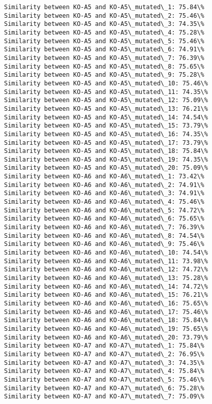 \documentclass[11pt]{article}
\begin{document}
\begin{Verbatim}[commandchars=\\\{\}]
Similarity between KO-A5 and KO-A5\_mutated\_1: 75.84\%
Similarity between KO-A5 and KO-A5\_mutated\_2: 75.46\%
Similarity between KO-A5 and KO-A5\_mutated\_3: 74.35\%
Similarity between KO-A5 and KO-A5\_mutated\_4: 75.28\%
Similarity between KO-A5 and KO-A5\_mutated\_5: 75.46\%
Similarity between KO-A5 and KO-A5\_mutated\_6: 74.91\%
Similarity between KO-A5 and KO-A5\_mutated\_7: 76.39\%
Similarity between KO-A5 and KO-A5\_mutated\_8: 75.65\%
Similarity between KO-A5 and KO-A5\_mutated\_9: 75.28\%
Similarity between KO-A5 and KO-A5\_mutated\_10: 75.46\%
Similarity between KO-A5 and KO-A5\_mutated\_11: 74.35\%
Similarity between KO-A5 and KO-A5\_mutated\_12: 75.09\%
Similarity between KO-A5 and KO-A5\_mutated\_13: 76.21\%
Similarity between KO-A5 and KO-A5\_mutated\_14: 74.54\%
Similarity between KO-A5 and KO-A5\_mutated\_15: 73.79\%
Similarity between KO-A5 and KO-A5\_mutated\_16: 74.35\%
Similarity between KO-A5 and KO-A5\_mutated\_17: 73.79\%
Similarity between KO-A5 and KO-A5\_mutated\_18: 75.84\%
Similarity between KO-A5 and KO-A5\_mutated\_19: 74.35\%
Similarity between KO-A5 and KO-A5\_mutated\_20: 75.09\%
Similarity between KO-A6 and KO-A6\_mutated\_1: 73.42\%
Similarity between KO-A6 and KO-A6\_mutated\_2: 74.91\%
Similarity between KO-A6 and KO-A6\_mutated\_3: 74.91\%
Similarity between KO-A6 and KO-A6\_mutated\_4: 75.46\%
Similarity between KO-A6 and KO-A6\_mutated\_5: 74.72\%
Similarity between KO-A6 and KO-A6\_mutated\_6: 75.65\%
Similarity between KO-A6 and KO-A6\_mutated\_7: 76.39\%
Similarity between KO-A6 and KO-A6\_mutated\_8: 74.54\%
Similarity between KO-A6 and KO-A6\_mutated\_9: 75.46\%
Similarity between KO-A6 and KO-A6\_mutated\_10: 74.54\%
Similarity between KO-A6 and KO-A6\_mutated\_11: 73.98\%
Similarity between KO-A6 and KO-A6\_mutated\_12: 74.72\%
Similarity between KO-A6 and KO-A6\_mutated\_13: 75.28\%
Similarity between KO-A6 and KO-A6\_mutated\_14: 74.72\%
Similarity between KO-A6 and KO-A6\_mutated\_15: 76.21\%
Similarity between KO-A6 and KO-A6\_mutated\_16: 75.65\%
Similarity between KO-A6 and KO-A6\_mutated\_17: 75.46\%
Similarity between KO-A6 and KO-A6\_mutated\_18: 75.84\%
Similarity between KO-A6 and KO-A6\_mutated\_19: 75.65\%
Similarity between KO-A6 and KO-A6\_mutated\_20: 73.79\%
Similarity between KO-A7 and KO-A7\_mutated\_1: 75.84\%
Similarity between KO-A7 and KO-A7\_mutated\_2: 76.95\%
Similarity between KO-A7 and KO-A7\_mutated\_3: 74.35\%
Similarity between KO-A7 and KO-A7\_mutated\_4: 75.84\%
Similarity between KO-A7 and KO-A7\_mutated\_5: 75.46\%
Similarity between KO-A7 and KO-A7\_mutated\_6: 75.28\%
Similarity between KO-A7 and KO-A7\_mutated\_7: 75.09\%

\end{Verbatim}
\end{document}
